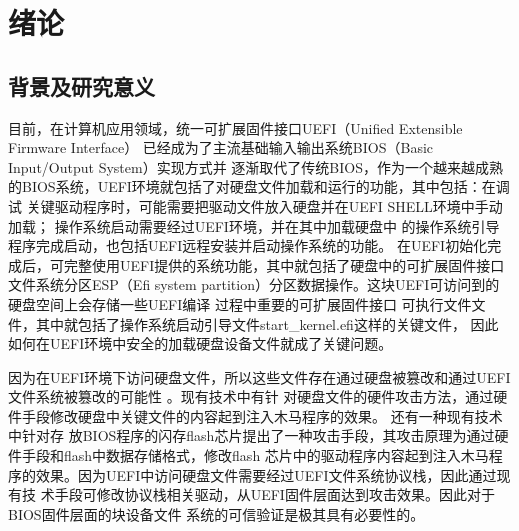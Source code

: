 %
%
\chapter{绪论}
%
%
\section{背景及研究意义}
目前，在计算机应用领域，统一可扩展固件接口UEFI（Unified Extensible Firmware Interface）
已经成为了主流基础输入输出系统BIOS（Basic Input/Output System）实现方式并
逐渐取代了传统BIOS，作为一个越来越成熟的BIOS系统，UEFI环境就包括了对硬盘文件加载和运行的功能，其中包括：在调试
关键驱动程序时，可能需要把驱动文件放入硬盘并在UEFI SHELL环境中手动加载\cite{english16,english20}；
操作系统启动需要经过UEFI环境，并在其中加载硬盘中
的操作系统引导程序完成启动，也包括UEFI远程安装并启动操作系统的功能\cite{chinese29}。
在UEFI初始化完成后，可完整使用UEFI提供的系统功能，其中就包括了硬盘中的可扩展固件接口
文件系统分区ESP（Efi system partition）分区数据操作。这块UEFI可访问到的硬盘空间上会存储一些UEFI编译
过程中重要的可扩展固件接口
可执行文件文件，其中就包括了操作系统启动引导文件start\_kernel.efi这样的关键文件\cite{chinese18}，
因此如何在UEFI环境中安全的加载硬盘设备文件就成了关键问题。
\par 因为在UEFI环境下访问硬盘文件，所以这些文件存在通过硬盘被篡改和通过UEFI文件系统被篡改的可能性
\cite{chinese16}。现有技术中有针
对硬盘文件的硬件攻击方法\cite{english5}，通过硬件手段修改硬盘中关键文件的内容起到注入木马程序的效果。
还有一种现有技术中针对存
放BIOS程序的闪存flash芯片提出了一种攻击手段\cite{english17}，其攻击原理为通过硬件手段和flash中数据存储格式，修改flash
芯片中的驱动程序内容起到注入木马程序的效果\cite{english6,english7}。因为UEFI中访问硬盘文件需要经过UEFI文件系统协议栈，因此通过现有技
术手段可修改协议栈相关驱动\cite{english3}，从UEFI固件层面达到攻击效果。因此对于BIOS固件层面的块设备文件
系统的可信验证是极其具有必要性的。

%
%
